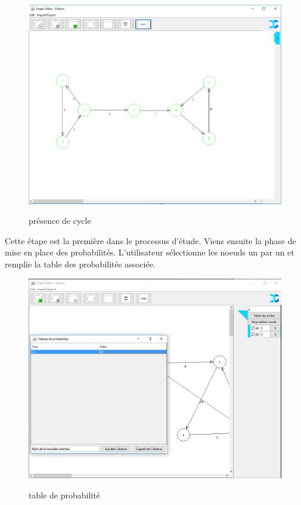 \documentclass[conference]{IEEEtran}
\begin{document}
\begin{figure}[!h]
\includegraphics[scale=0.3]{Cycle.png}
\label{fig 2}
\caption{présence de cycle}
\end{figure}

Cette étape est la première dans le processus d'étude. Viens ensuite la phase de mise en place des probabilités. L'utilisateur sélectionne les noeuds un par un et remplie la table des probabilités associée.

\begin{figure}[!h]
\includegraphics[scale=0.3]{Proba.png}
\label{fig 3}
\caption{table de probabilité}
\end{figure}
\end{document}
